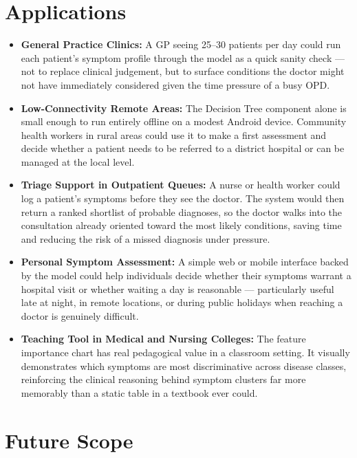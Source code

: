 \documentclass[12pt,a4paper]{article}
\begin{document}
\section{Applications}

\begin{itemize}
    \item \textbf{General Practice Clinics:} A GP seeing 25--30 patients per day could run each patient's symptom profile through the model as a quick sanity check --- not to replace clinical judgement, but to surface conditions the doctor might not have immediately considered given the time pressure of a busy OPD.
    \item \textbf{Low-Connectivity Remote Areas:} The Decision Tree component alone is small enough to run entirely offline on a modest Android device. Community health workers in rural areas could use it to make a first assessment and decide whether a patient needs to be referred to a district hospital or can be managed at the local level.
    \item \textbf{Triage Support in Outpatient Queues:} A nurse or health worker could log a patient's symptoms before they see the doctor. The system would then return a ranked shortlist of probable diagnoses, so the doctor walks into the consultation already oriented toward the most likely conditions, saving time and reducing the risk of a missed diagnosis under pressure.
    \item \textbf{Personal Symptom Assessment:} A simple web or mobile interface backed by the model could help individuals decide whether their symptoms warrant a hospital visit or whether waiting a day is reasonable --- particularly useful late at night, in remote locations, or during public holidays when reaching a doctor is genuinely difficult.
    \item \textbf{Teaching Tool in Medical and Nursing Colleges:} The feature importance chart has real pedagogical value in a classroom setting. It visually demonstrates which symptoms are most discriminative across disease classes, reinforcing the clinical reasoning behind symptom clusters far more memorably than a static table in a textbook ever could.
\end{itemize}

\section{Future Scope}
\end{document}

